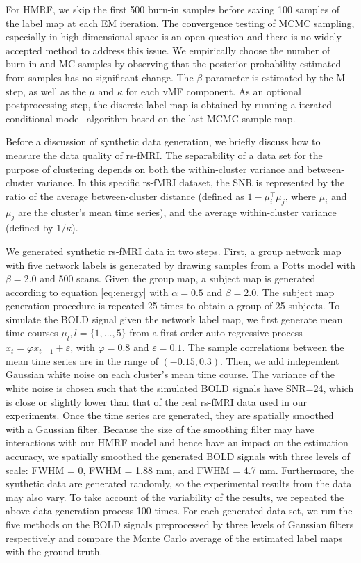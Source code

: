 \documentclass[review,authoryear]{elsarticle}
\begin{document}
For HMRF, we skip the first 500 burn-in samples before saving 100 samples of the
label map at each EM iteration. The convergence testing of MCMC sampling,
especially in high-dimensional space is an open question and there is no widely
accepted method to address this issue. We empirically choose the number of
burn-in and MC samples by observing that the posterior probability estimated
from samples has no significant change. The $\beta$ parameter is estimated by
the M step, as well as the $\mu$ and $\kappa$ for each vMF component.  As an
optional postprocessing step, the discrete label map is obtained by running a
iterated conditional mode~\citep{besag1986statistical} algorithm based on the
last MCMC sample map.

Before a discussion of synthetic data generation, we briefly discuss how to
measure the data quality of rs-fMRI. The separability of a data set for the
purpose of clustering depends on both the within-cluster variance and
between-cluster variance. In this specific rs-fMRI dataset, the SNR is
represented by the ratio of the average between-cluster distance (defined as $1
-\mu_i^\intercal \mu_j$, where $\mu_i$ and $\mu_j$ are the cluster's mean time
series), and the average within-cluster variance (defined by $1/\kappa$).

We generated synthetic rs-fMRI data in two steps. First, a group network map
with five network labels is generated by drawing samples from a Potts model with
$\beta = 2.0$ and 500 scans. Given the group map, a subject map is generated
according to equation \eqref{eq:energy} with $\alpha=0.5$ and $\beta = 2.0$. The
subject map generation procedure is repeated 25 times to obtain a group of 25
subjects. To simulate the BOLD signal given the network label map, we first
generate mean time courses $\mu_l, l=\{1,\dots, 5\}$ from a first-order
auto-regressive process $x_t = \varphi x_{t-1} + \varepsilon$, with $\varphi =
0.8$ and $\varepsilon = 0.1$.  The sample correlations between the mean time
series are in the range of $(-0.15, 0.3)$. Then, we add independent Gaussian
white noise on each cluster's mean time course. The variance of the white noise
is chosen such that the simulated BOLD signals have SNR=24, which is close or
slightly lower than that of the real rs-fMRI data used in our experiments. Once
the time series are generated, they are spatially smoothed with a Gaussian
filter. Because the size of the smoothing filter may have interactions with our
HMRF model and hence have an impact on the estimation accuracy, we spatially
smoothed the generated BOLD signals with three levels of scale: FWHM = 0, FWHM =
1.88 mm, and FWHM = 4.7 mm.  Furthermore, the synthetic data are generated
randomly, so the experimental results from the data may also vary. To take
account of the variability of the results, we repeated the above data generation
process 100 times.  For each generated data set, we run the five methods on the
BOLD signals preprocessed by three levels of Gaussian filters respectively and
compare the Monte Carlo average of the estimated label maps with the ground
truth.
\end{document}
